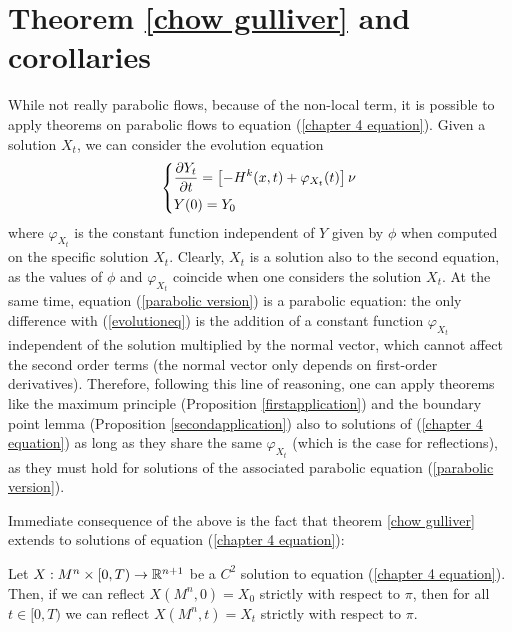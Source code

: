\section{Theorem \ref{chow gulliver} and corollaries}
While not really parabolic flows, because of the non-local term, it is possible to apply theorems on parabolic flows to equation (\ref{chapter 4 equation}). Given a solution $X_t$, we can consider the evolution equation 
\begin{align}
	\begin{dcases}
		\frac{\partial Y_t}{\partial t} = \left[- H^k(x, t) + \varphi_{X_t}(t)\right] \nu\\
		Y(0)= Y_0
	\end{dcases} \label{parabolic version}
\end{align}
where $\varphi_{X_t}$ is the constant function independent of $Y$ given by $\phi$ when computed on the specific solution $X_t$. 
Clearly, $X_t$ is a solution also to the second equation, as the values of  $\phi$ and $\varphi_{X_t}$ coincide when one considers the solution $X_t$. At the same time, equation (\ref{parabolic version}) is a parabolic equation: the only difference with (\ref{evolutioneq}) is the addition of a constant function $\varphi_{X_t}$ independent of the solution multiplied by the normal vector, which cannot affect the second order terms (the normal vector only depends on first-order derivatives). Therefore, following this line of reasoning, one can apply theorems like the maximum principle (Proposition \ref{firstapplication}) and the boundary point lemma (Proposition \ref{secondapplication}) also to solutions of (\ref{chapter 4 equation}) as long as they share the same $\varphi_{X_t}$ (which is the case for reflections), as they must hold for solutions of the associated parabolic equation (\ref{parabolic version}). %

Immediate consequence of the above is the fact that theorem \ref{chow gulliver} extends to solutions of equation (\ref{chapter 4 equation}):

\begin{theorem}
	Let $X:M^n\times [0,T) \rightarrow \mathbb{R}^{n+1}$ be a $C^2$ solution to equation (\ref{chapter 4 equation}). Then, if we can reflect $X(M^n, 0)=X_0$ strictly with respect to $\pi$, then for all $t\in [0,T)$ we can reflect $X(M^n, t)=X_t$ strictly with respect to $\pi$. \label{chow gulliver chapter 4}
\end{theorem}

